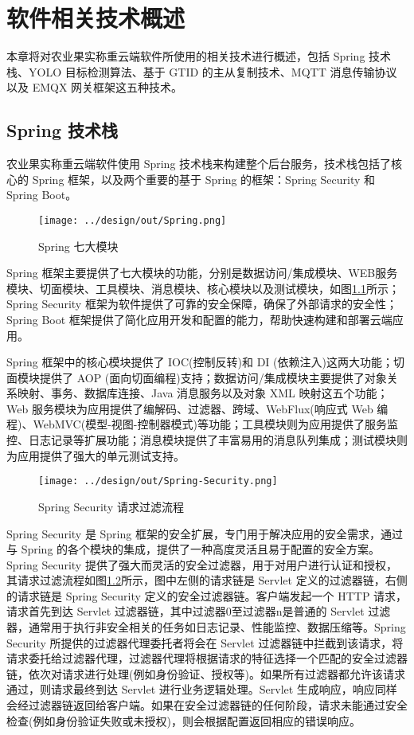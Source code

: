 \chapter{软件相关技术概述}

本章将对农业果实称重云端软件所使用的相关技术进行概述，包括 Spring 技术栈、YOLO 目标检测算法、基于 GTID 的主从复制技术、MQTT 消息传输协议以及 EMQX 网关框架这五种技术。

\section{Spring 技术栈}\label{sec:spring}

农业果实称重云端软件使用 Spring 技术栈来构建整个后台服务，技术栈包括了核心的 Spring 框架，以及两个重要的基于 Spring 的框架：Spring Security 和 Spring Boot。

\begin{figure}[H]
    \centering
    \texttt{[image: ../design/out/Spring.png]}
    \caption{Spring 七大模块}
    \label{fig:Spring}
\end{figure}

Spring 框架主要提供了七大模块的功能，分别是数据访问/集成模块、WEB服务模块、切面模块、工具模块、消息模块、核心模块以及测试模块，如图\ref{fig:Spring}所示；Spring Security 框架为软件提供了可靠的安全保障，确保了外部请求的安全性；Spring Boot 框架提供了简化应用开发和配置的能力，帮助快速构建和部署云端应用。

Spring 框架中的核心模块提供了 IOC(控制反转)和 DI (依赖注入)这两大功能；切面模块提供了 AOP (面向切面编程)支持；数据访问/集成模块主要提供了对象关系映射、事务、数据库连接、Java 消息服务以及对象 XML 映射这五个功能；Web 服务模块为应用提供了编解码、过滤器、跨域、WebFlux(响应式 Web 编程)、WebMVC(模型-视图-控制器模式)等功能；工具模块则为应用提供了服务监控、日志记录等扩展功能；消息模块提供了丰富易用的消息队列集成；测试模块则为应用提供了强大的单元测试支持\cite{Spring-框架概述}。

\begin{figure}[H]
    \centering
    \texttt{[image: ../design/out/Spring-Security.png]}
    \caption{Spring Security 请求过滤流程}
    \label{fig:Spring-Security}
\end{figure}

Spring Security 是 Spring 框架的安全扩展，专门用于解决应用的安全需求，通过与 Spring 的各个模块的集成，提供了一种高度灵活且易于配置的安全方案。Spring Security 提供了强大而灵活的安全过滤器，用于对用户进行认证和授权，其请求过滤流程如图\ref{fig:Spring-Security}所示，图中左侧的请求链是 Servlet 定义的过滤器链，右侧的请求链是 Spring Security 定义的安全过滤器链。客户端发起一个 HTTP 请求，请求首先到达 Servlet 过滤器链，其中过滤器0至过滤器n是普通的 Servlet 过滤器，通常用于执行非安全相关的任务如日志记录、性能监控、数据压缩等。Spring Security 所提供的过滤器代理委托者将会在 Servlet 过滤器链中拦截到该请求，将请求委托给过滤器代理，过滤器代理将根据请求的特征选择一个匹配的安全过滤器链，依次对请求进行处理(例如身份验证、授权等)。如果所有过滤器都允许该请求通过，则请求最终到达 Servlet 进行业务逻辑处理。Servlet 生成响应，响应同样会经过滤器链返回给客户端。如果在安全过滤器链的任何阶段，请求未能通过安全检查(例如身份验证失败或未授权)，则会根据配置返回相应的错误响应\cite{Spring-Security-架构设计}。

